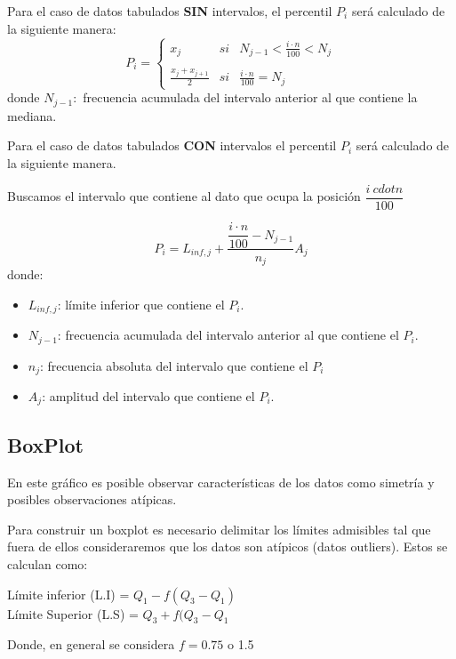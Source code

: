 \documentclass[12pt,twocolumn,a4paper]{report}
\begin{document}
Para el caso de datos tabulados \textbf{SIN} intervalos, el percentil $P_i$ será calculado de la siguiente manera:
\begin{equation*}
P_i= \left\{ \begin{array}{lcc}
             x_j & si & N_{j-1} < \frac{i \cdot n}{100} < N_j \\
             \\ \frac{x_j + x_{j+1}}{2} & si & \frac{i\cdot n}{100} = N_j
             \end{array}
   \right.
\end{equation*}
donde $N_{j-1}:$ frecuencia acumulada del intervalo anterior al que contiene la mediana. 

Para el caso de datos tabulados \textbf{CON} intervalos el percentil $P_i$ será calculado de la siguiente manera. 

Buscamos el intervalo que contiene al dato que ocupa la posición $\dfrac{i \ cdot n}{100}$

\begin{equation*}
P_i = L_{inf,j} + \frac{\dfrac{i \cdot n}{100} - N_{j-1}}{n_j} A_j
\end{equation*}
donde: 
\begin{itemize}
\setlength\itemsep{0.001cm}
\item{$L_{inf,j}$: límite inferior que contiene el $P_i$.}
\item{$N_{j-1}$: frecuencia acumulada del intervalo anterior al que contiene el $P_i$.}
\item{$n_j$: frecuencia absoluta del intervalo que contiene el $P_i$}
\item{$A_j$: amplitud del intervalo que contiene el $P_i$. }
\end{itemize}

\subsection*{BoxPlot}
En este gráfico es posible observar características de los datos como simetría y posibles observaciones atípicas. 

Para construir un boxplot es necesario delimitar los límites admisibles tal que fuera de ellos consideraremos que los datos son atípicos (datos outliers). Estos se calculan como: 

Límite inferior (L.I) = $Q_1 - f(Q_3 - Q_1)$ \\
Límite Superior (L.S) = $Q_3 + f(Q_3 - Q_1$ 

Donde, en general se considera $f = 0.75 $ o 1.5 
\end{document}
